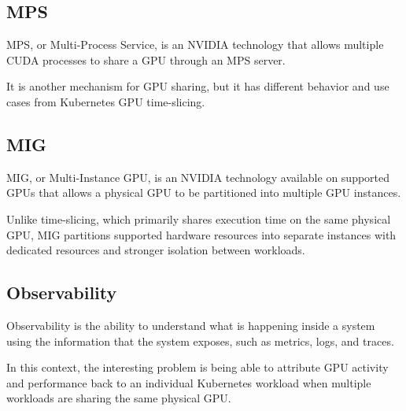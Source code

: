 \subsection{MPS}

MPS, or Multi-Process Service, is an NVIDIA technology that allows multiple CUDA processes to share a GPU through an MPS server.

It is another mechanism for GPU sharing, but it has different behavior and use cases from Kubernetes GPU time-slicing.

\subsection{MIG}

MIG, or Multi-Instance GPU, is an NVIDIA technology available on supported GPUs that allows a physical GPU to be partitioned into multiple GPU instances.

Unlike time-slicing, which primarily shares execution time on the same physical GPU, MIG partitions supported hardware resources into separate instances with dedicated resources and stronger isolation between workloads.

\subsection{Observability}

Observability is the ability to understand what is happening inside a system using the information that the system exposes, such as metrics, logs, and traces.

In this context, the interesting problem is being able to attribute GPU activity and performance back to an individual Kubernetes workload when multiple workloads are sharing the same physical GPU.


